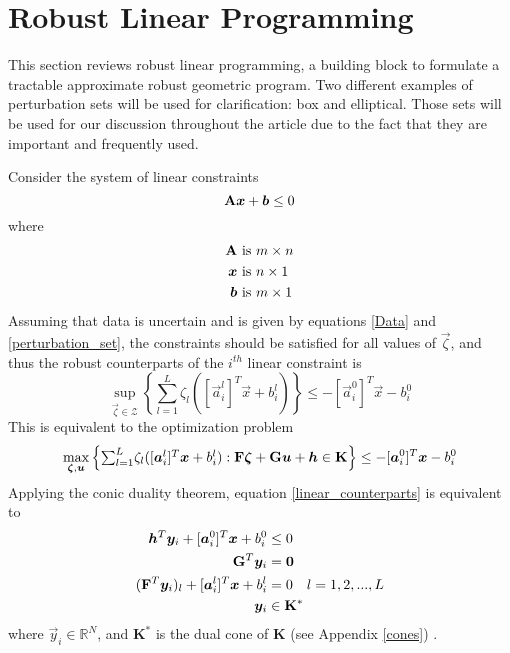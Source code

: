 \section{Robust Linear Programming} \label{LP_to_GP}

This section reviews robust linear programming, a building block to formulate a tractable approximate robust geometric program. Two different examples of perturbation sets will be used for clarification: box and elliptical. Those sets will be used for our discussion throughout the article due to the fact that they are important and frequently used.

Consider the system of linear constraints
\begin{displaymath}
    \mathbf{A}\bm{x} + \bm{b} \leq 0
\end{displaymath}
where
\begin{equation*}
\begin{aligned}
\mathbf{A} &\text{ is $m \times n$}\\
\bm{x} &\text{ is $n \times 1$}\\
\bm{b} &\text{ is $m \times 1$}\\
\end{aligned}
\end{equation*}
Assuming that data is uncertain and is given by equations \eqref{Data} and \eqref{perturbation_set}, the constraints should be satisfied for all values of $\vec{\zeta}$, and thus the robust counterparts of the $i^{th}$ linear constraint is
\begin{equation*}
    \sup_{\vec{\zeta} \in \mathcal{Z}}\left\{ \textstyle{\sum}_{l=1}^{L} \zeta_l([\vec{a}^l_i]^T \vec{x} + b^l_i) \right\} \leq - [\vec{a}^0_i]^T\vec{x} - b^0_i
\end{equation*}
This is equivalent to the optimization problem
\begin{equation}
    \max_{\vec{\zeta},\vec{u}} \left\{ \textstyle{\sum}_{l=1}^{L} \zeta_l([\vec{a}^l_i]^T \vec{x} + b^l_i): \mat{F}\vec{\zeta} + \mat{G}\vec{u} + \vec{h} \in \mathbf{K} \right\} \leq - [\vec{a}^0_i]^T\vec{x} - b^0_i
\label{linear_counterparts}
\end{equation}
Applying the conic duality theorem, equation \eqref{linear_counterparts} is equivalent to
\begin{equation}
\begin{aligned}
\vec{h}^T\vec{y}_i + [\vec{a}_i^0]^T\vec{x} + b_i^0 &\leq 0\\
\mat{G}^T\vec{y}_i &= \vec{0}\\
(\mat{F}^T\vec{y}_i)_l + [\vec{a}_i^l]^T\vec{x} + b_i^l &= 0 \quad l = 1,2,...,L\\
\vec{y}_i &\in \mathbf{K}^*
\end{aligned}
\label{robust_linear_general}
\end{equation}
where $\vec{y}_i \in \mathbb{R}^N$, and $\mathbf{K}^*$ is the dual cone of $\mathbf{K}$ (see Appendix \ref{cones}) \cite{ben-tal_ghaoui_nemirovski_2009}.

